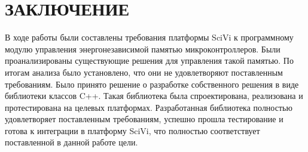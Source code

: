\chapter*{ЗАКЛЮЧЕНИЕ}

В ходе работы были составлены требования платформы SciVi к программному модулю управления энергонезависимой памятью микроконтроллеров.
Были проанализированы существующие решения для управления такой памятью.
По итогам анализа было установлено, что они не удовлетворяют поставленным требованиям. Было принято решение о разработке собственного решения в виде библиотеки классов C++.
Такая библиотека была спроектирована, реализована и протестирована на целевых платформах.
Разработанная библиотека полностью удовлетворяет поставленным требованиям, успешно прошла тестирование и готова к интеграции в платформу SciVi, что полностью соответствует поставленной в данной работе цели.
